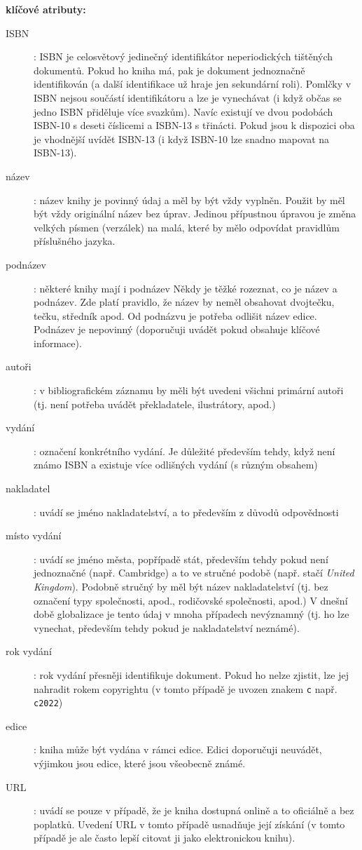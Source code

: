 \documentclass[male,czech,api_bc]{kitheses}
\begin{document}
\textbf{klíčové atributy:}

\begin{description}
\item[ISBN]: ISBN je celosvětový jedinečný identifikátor neperiodických tištěných dokumentů. Pokud ho kniha má, pak je dokument jednoznačně identifikován (a další identifikace už hraje jen sekundární roli). Pomlčky v ISBN nejsou součástí identifikátoru a lze je vynechávat (i když občas se jedno ISBN přiděluje více svazkům). Navíc existují ve dvou podobách ISBN-10 s deseti číslicemi a ISBN-13 s třinácti. Pokud jsou k dispozici oba je vhodnější uvídět ISBN-13 (i když ISBN-10 lze snadno mapovat na ISBN-13).
\item[název]: název knihy je povinný údaj a měl by být vždy vyplněn. Použit by měl být vždy originální název bez úprav. Jedinou přípustnou úpravou je změna velkých písmen (verzálek) na malá, které by mělo odpovídat pravidlům příslušného jazyka.
\item[podnázev]: některé knihy mají i podnázev Někdy je těžké rozeznat, co je název a podnázev. Zde platí pravidlo, že název by neměl obsahovat dvojtečku, tečku, středník apod. Od podnázvu je potřeba odlišit název edice. Podnázev je nepovinný (doporučuji uvádět pokud obsahuje klíčové informace).
\item[autoři]: v bibliografickém záznamu by měli být uvedeni všichni primární autoři (tj. není potřeba uvádět překladatele, ilustrátory, apod.)
\item[vydání]: označení konkrétního vydání. Je důležité především tehdy, když není známo ISBN a existuje více odlišných vydání (s různým obsahem)
\item[nakladatel]: uvádí se jméno nakladatelství, a to především z důvodů odpovědnosti
\item[místo vydání]: uvádí se jméno města, popřípadě stát, především tehdy pokud není jednoznačné (např. Cambridge) a to ve stručné podobě (např. stačí \textit{United Kingdom}).  Podobně stručný by měl být název nakladatelství (tj. bez označení typy společnosti, apod., rodičovské společnosti, apod.)
V dnešní době globalizace je tento údaj v mnoha případech nevýznamný (tj. ho lze vynechat, především tehdy pokud je nakladatelství neznámé).
\item[rok vydání]: rok vydání přesněji identifikuje dokument. Pokud ho nelze zjistit, lze jej nahradit rokem copyrightu (v tomto případě je uvozen znakem \verb!c! např. \verb!c2022!)
\item[edice]: kniha může být vydána v rámci edice. Edici doporučuji neuvádět, výjimkou jsou edice, které jsou všeobecně známé.
\item[URL]: uvádí se pouze v případě, že je kniha dostupná onlině a to oficiálně a bez poplatků. Uvedení URL v tomto případě usnadňuje její získání (v tomto případě je ale často lepší citovat ji jako elektronickou knihu).
\end{description}
\end{document}
